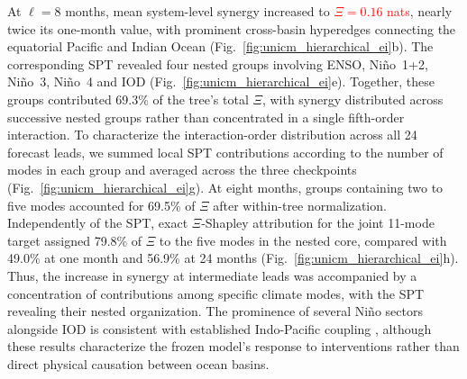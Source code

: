 \documentclass[fleqn,10pt]{wlscirep}
\newcommand{\rev}[1]{\textcolor{red}{#1}}
\theoremstyle{naturetheorem}
\begin{document}
At $\ell=8$ months, mean system-level synergy increased to %
\rev{$\Xi=0.16$ nats}, nearly twice its one-month value, with prominent cross-basin hyperedges connecting the equatorial Pacific and Indian Ocean (Fig.~\ref{fig:unicm_hierarchical_ei}b). The corresponding SPT revealed four nested groups involving ENSO, Ni\~no~1+2, Ni\~no~3, Ni\~no~4 and IOD (Fig.~\ref{fig:unicm_hierarchical_ei}e). Together, these groups contributed 69.3\% of the tree's total $\Xi$, with synergy distributed across successive nested groups rather than concentrated in a single fifth-order interaction. To characterize the interaction-order distribution across all 24 forecast leads, we summed local SPT contributions according to the number of modes in each group and averaged across the three checkpoints (Fig.~\ref{fig:unicm_hierarchical_ei}g). At eight months, groups containing two to five modes accounted for 69.5\% of $\Xi$ after within-tree normalization. Independently of the SPT, exact $\Xi$-Shapley attribution for the joint 11-mode target assigned 79.8\% of $\Xi$ to the five modes in the nested core, compared with 49.0\% at one month and 56.9\% at 24 months (Fig.~\ref{fig:unicm_hierarchical_ei}h). Thus, the increase in synergy at intermediate leads was accompanied by a concentration of contributions among specific climate modes, with the SPT revealing their nested organization. The prominence of several Ni\~no sectors alongside IOD is consistent with established Indo-Pacific coupling \cite{Cai2019Pantropical,Kim2022Pantropical,Pothapakula2020Synergistic}, although these results characterize the frozen model's response to interventions rather than direct physical causation between ocean basins.

\end{document}
